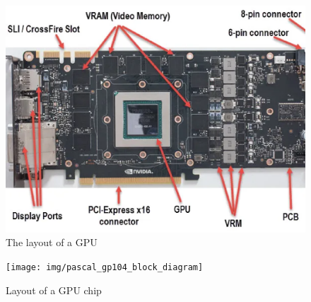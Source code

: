 

\begin{figure}
\caption{The layout of a GPU}
\includegraphics[width = \textwidth]{img/graphics-card-components-3119853491}
\end{figure}

\begin{figure}
\caption{Layout of a GPU chip}
\texttt{[image: img/pascal\_gp104\_block\_diagram]}
\end{figure}

